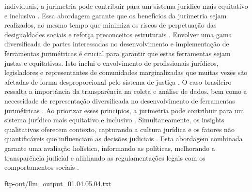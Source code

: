individuais, a jurimetria pode contribuir para um sistema jurídico mais equitativo e inclusivo \cite{10.1590/dados.2022.65.3.267,10.1057/s41599-020-0396-5}. Essa abordagem garante que os benefícios da jurimetria sejam realizados, ao mesmo tempo que minimiza os riscos de perpetuação das desigualdades sociais e reforça preconceitos estruturais \cite{10.1590/dados.2022.65.3.267,10.1057/s41599-020-0396-5}. Envolver uma gama diversificada de partes interessadas no desenvolvimento e implementação de ferramentas jurimétricas é crucial para garantir que estas ferramentas sejam justas e equitativas. Isto inclui o envolvimento de profissionais jurídicos, legisladores e representantes de comunidades marginalizadas que muitas vezes são afetadas de forma desproporcional pelo sistema de justiça \cite{10.1007/s11186-021-09453-1,1023071190721}. O caso brasileiro ressalta a importância da transparência na coleta e análise de dados, bem como a necessidade de representação diversificada no desenvolvimento de ferramentas jurimétricas \cite{10.1590/dados.2022.65.3.267,10.1007/978-3-319-44000-215 }. Ao priorizar esses princípios, a jurimetria pode contribuir para um sistema jurídico mais equitativo e inclusivo \cite{ibeiro2021,restrepoamariles2015}. Simultaneamente, os insights qualitativos oferecem contexto, capturando a cultura jurídica e os fatores não quantificáveis que influenciam as decisões judiciais \cite{restrepoamariles2015,nunes2018}. Esta abordagem combinada garante uma avaliação holística, informando as políticas, melhorando a transparência judicial e alinhando as regulamentações legais com os comportamentos sociais \cite{massuanganhe2016,silva2023}. 

ftp-out/llm_output_01.04.05.04.txt 



